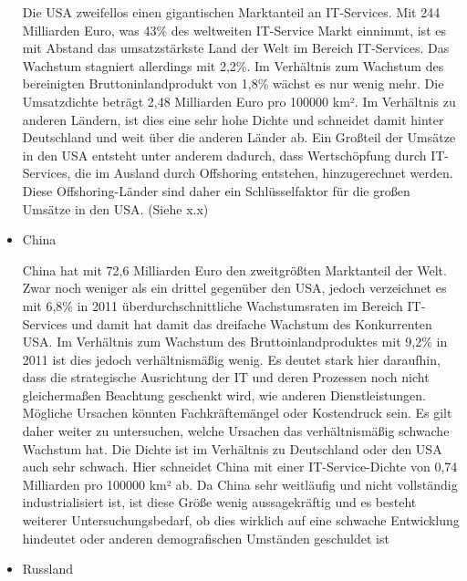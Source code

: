 \begin{itemize}
Die USA zweifellos einen gigantischen Marktanteil an IT-Services. Mit 244 Milliarden Euro, was 43\% des weltweiten IT-Service Markt einnimmt, ist es mit Abstand das umsatzstärkste Land der Welt im Bereich IT-Services. \cite{ibisUSA} Das Wachstum stagniert allerdings mit 2,2\%. Im Verhältnis zum Wachstum des bereinigten Bruttoninlandprodukt von 1,8\% wächst es nur wenig mehr. \cite{statUSA} Die Umsatzdichte beträgt 2,48 Milliarden Euro pro 100000 km². Im Verhältnis zu anderen Ländern, ist dies eine sehr hohe Dichte und schneidet damit hinter Deutschland und weit über die anderen Länder ab.
Ein Großteil der Umsätze in den USA entsteht unter anderem dadurch, dass Wertschöpfung durch IT-Services, die im Ausland durch Offshoring entstehen, hinzugerechnet werden. Diese Offshoring-Länder sind daher ein Schlüsselfaktor für die großen Umsätze in den USA. (Siehe x.x)

 \newline
  \newline
\item {China}

China hat mit 72,6 Milliarden Euro den zweitgrößten Marktanteil der Welt. Zwar noch weniger als ein drittel gegenüber den USA, jedoch verzeichnet es mit 6,8\% in 2011 überdurchschnittliche Wachstumsraten im Bereich IT-Services und damit hat damit das dreifache Wachstum des Konkurrenten USA.  Im Verhältnis zum  Wachstum des Bruttoinlandproduktes mit 9,2\% in 2011 ist dies jedoch verhältnismäßig wenig. Es deutet stark hier daraufhin, dass die strategische Ausrichtung der IT und deren Prozessen noch nicht  gleichermaßen Beachtung geschenkt wird, wie anderen Dienstleistungen. Mögliche Ursachen könnten Fachkräftemängel oder Kostendruck sein. Es gilt daher weiter zu untersuchen, welche Ursachen das verhältnismäßig schwache Wachstum hat. Die Dichte ist im Verhältnis zu Deutschland oder den USA auch sehr schwach. Hier schneidet China mit einer IT-Service-Dichte von 0,74 Milliarden pro 100000 km² ab. Da China sehr weitläufig und nicht vollständig industrialisiert ist, ist diese Größe wenig aussagekräftig und es besteht weiterer Untersuchungsbedarf, ob dies wirklich auf eine schwache Entwicklung hindeutet oder anderen demografischen Umständen geschuldet ist \cite{ibisChina}
 \newline
 \newline
\item {Russland}


\end{itemize}
